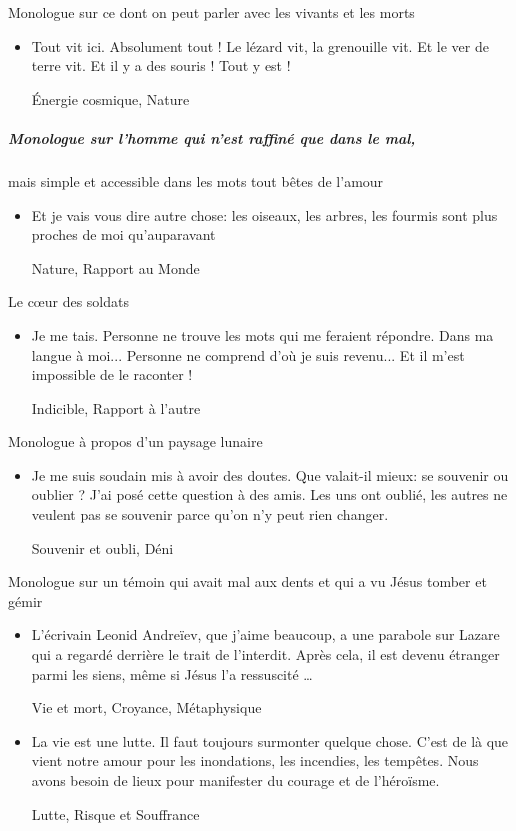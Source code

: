 \documentclass[french,a4paper,11pt,answers]{exam}
\newcommand{\cit}[2]{\og #1 \fg{} \begin{solution}{ #2 }\end{solution}} %
\begin{document}
	\begin{cadre}{Monologue sur ce dont on peut parler avec les vivants et les morts}
		\begin{itemize}
			\item \cit {Tout vit ici. Absolument tout ! Le lézard vit, la grenouille vit. Et le ver de terre vit. Et il y a des souris ! Tout y est !}{Énergie cosmique, Nature}
		\end{itemize}
	\end{cadre}
	
	\subparagraph{Monologue sur l'homme qui n'est raffiné que dans le mal{,}}
	\begin{cadre}{mais simple et accessible dans les mots tout bêtes de l'amour}
		\begin{itemize}
			\item \cit {Et je vais vous dire autre chose: les oiseaux, les arbres, les fourmis sont plus proches de moi qu'auparavant}{Nature, Rapport au Monde}
		\end{itemize}
	\end{cadre}
	
	\begin{cadre}{Le c\oe{}ur des soldats}
		\begin{itemize}
			\item \cit {Je me tais. Personne ne trouve les mots qui me feraient répondre. Dans ma langue à moi... Personne ne comprend d'où je suis revenu... Et il m'est impossible de le raconter !}{Indicible, Rapport à l'autre}
		\end{itemize}
	\end{cadre}

	\begin{cadre}{Monologue à propos d'un paysage lunaire}
		\begin{itemize}
			\item \cit {Je me suis soudain mis à avoir des doutes. Que valait-il mieux: se souvenir ou oublier ? J'ai posé cette question à des amis. Les uns ont oublié, les autres ne veulent pas se souvenir parce qu'on n'y peut rien changer.}{Souvenir et oubli, Déni}
		\end{itemize}
	\end{cadre}
	
	\begin{cadre}{Monologue sur un témoin qui avait mal aux dents et qui a vu Jésus tomber et gémir}
		\begin{itemize}
			\item \cit {L'écrivain Leonid Andreïev, que j'aime beaucoup, a une parabole sur Lazare qui a regardé derrière le trait de l'interdit. Après cela, il est devenu étranger parmi les siens, même si Jésus l'a ressuscité \dots}{Vie et mort, Croyance, Métaphysique}
			\item \cit{La vie est une lutte. Il faut toujours surmonter quelque chose. C'est de là que vient notre amour pour les inondations, les incendies, les tempêtes. Nous avons besoin de lieux pour \og manifester du courage et de l'héroïsme.\fg{}}{Lutte, Risque et Souffrance}
		\end{itemize}
	\end{cadre}
		
\end{document}
